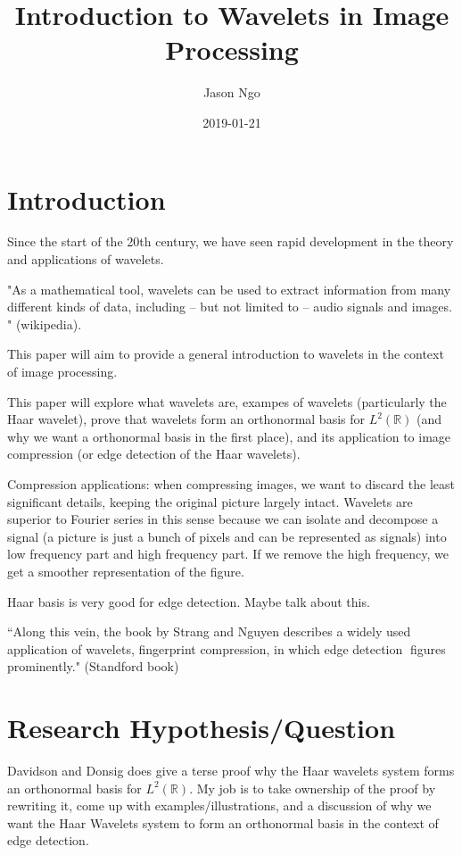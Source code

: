 \documentclass[11pt]{amsart}
\title{Introduction to Wavelets in Image Processing}
\author{Jason Ngo}
\date{2019-01-21}
\theoremstyle{theorem} %
\theoremstyle{definition}                  %
\theoremstyle{example}                       %
\theoremstyle{remark}                       %
\numberwithin{equation}{section}
\newcommand{\R}{\mathbb{R}}
\begin{document}
\maketitle

\section{Introduction}

Since the start of the 20th century, we have seen rapid development in the theory and applications of wavelets. 

"As a mathematical tool, wavelets can be used to extract information from many different kinds of data, including – but not limited to – audio signals and images. " (wikipedia).

This paper will aim to provide a general introduction to wavelets in the context of image processing.

This paper will explore what wavelets are, exampes of wavelets (particularly the Haar wavelet), prove that wavelets form an orthonormal basis for $ L^2(\R) $ (and why we want a orthonormal basis in the first place), and its application to image compression (or edge detection of the Haar wavelets).

Compression applications: when compressing images, we want to discard the least significant details, keeping the original picture largely intact. Wavelets are superior to Fourier series in this sense because we can isolate and decompose a signal (a picture is just a bunch of pixels and can be represented as signals) into low frequency part and high frequency part. If we remove the high frequency, we get a smoother representation of the figure.

Haar basis is very good for edge detection. Maybe talk about this.

``Along this vein, the book by Strang and Nguyen describes a widely used application of wavelets, fingerprint compression, in which edge detection figures prominently." (Standford book)

\section{Research Hypothesis/Question}

Davidson and Donsig does give a terse proof why the Haar wavelets system forms an orthonormal basis for $ L^2(\R) $. My job is to take ownership of the proof by rewriting it, come up with examples/illustrations, and a discussion of why we want the Haar Wavelets system to form an orthonormal basis in the context of edge detection.
\end{document}
